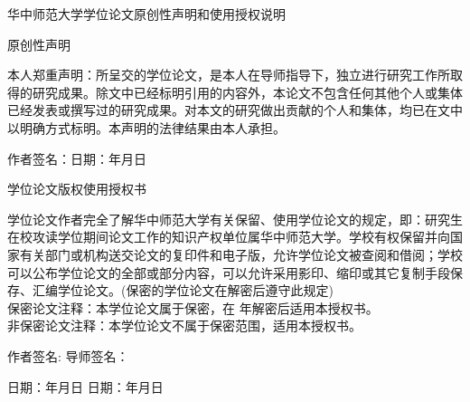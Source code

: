 \begin{center}
\vspace*{0mm}
{\bfseries {} \kaishu \centerline
{华中师范大学学位论文原创性声明和使用授权说明}}

\parbox[t][1.4cm][c]{\textwidth}{{\bfseries {} \kaishu \centerline
{原创性声明}}}

\parbox[t][2.8cm][c]{\textwidth}{
\hspace{2em}本人郑重声明：所呈交的学位论文，是本人在导师指导下，独立进行研究工作所取得的研究成果。除文中已经标明引用的内容外，本论文不包含任何其他个人或集体已经发表或撰写过的研究成果。对本文的研究做出贡献的个人和集体，均已在文中以明确方式标明。本声明的法律结果由本人承担。}
\parbox[t][1.2cm][c]{\textwidth}{
\selectfont
\hspace{2em}\fangsong
作者签名：\hspace*{5.3cm}日期：\underline{\hspace{3em}}年\underline{\hspace{2em}}月\underline{\hspace{2em}}日}

\parbox[t][1.4cm][c]{\textwidth}{{ \bfseries \kaishu \centerline
{学位论文版权使用授权书}}}

\parbox[t][5cm][c]{\textwidth}{
\hspace{2em}学位论文作者完全了解华中师范大学有关保留、使用学位论文的规定，即：研究生在校攻读学位期间论文工作的知识产权单位属华中师范大学。学校有权保留并向国家有关部门或机构送交论文的复印件和电子版，允许学位论文被查阅和借阅；学校可以公布学位论文的全部或部分内容，可以允许采用影印、缩印或其它复制手段保存、汇编学位论文。(保密的学位论文在解密后遵守此规定)\\
保密论文注释：本学位论文属于保密，在 \underline{\hspace{1cm}}年解密后适用本授权书。\\
非保密论文注释：本学位论文不属于保密范围，适用本授权书。
}
\parbox[t][1.8cm][c]{\textwidth}{
\hspace{2em}\fangsong   作者签名:   \hspace*{5.3cm}   导师签名：}
\parbox[t][0.1cm][c]{\textwidth}{
\hspace{2em}\fangsong 日期：\underline{\hspace{3em}}年\underline{\hspace{2em}}月\underline{\hspace{2em}}日
\hspace*{1.4cm}日期：\underline{\hspace{3em}}年\underline{\hspace{2em}}月\underline{\hspace{2em}}日
}


\end{center}
